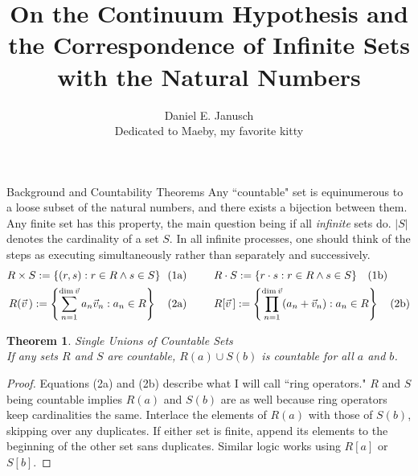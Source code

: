 \documentclass[12pt]{article}
\newtheorem{thm}{Theorem}
\begin{document}
\title{On the Continuum Hypothesis and the Correspondence of Infinite Sets with the Natural Numbers}
\author{Daniel E. Janusch\\Dedicated to Maeby, my favorite kitty}
\maketitle

\begin{section}{Background and Countability Theorems}\label{sec:background}
	Any ``countable" set is equinumerous to a loose subset of the natural numbers,
	and there exists a bijection between them. Any finite set has this property, the
	main question being if all \emph{infinite} sets do. $|S|$ denotes the cardinality
	of a set $S$. In all infinite processes, one should think of the steps as executing
	simultaneously rather than separately and successively.\vspace{-1em}\\
	\begin{align}
		R\times S :=\{(r,s):r\in R\land s\in S\}~~(1 & \text a)
		\hspace{2.5em}
		R\cdot S :=\{r\cdot s:r\in R\land s\in S\}~~~(1\text b)
		\\
		R(\vec v\,):=\left\{\sum_{n=1}^{\dim\vec v}a_n\vec v_n:a_n\in R\right\}~~~(2 & \text a)
		\hspace{2.5em}
		R[\vec v\,]:=\left\{\prod_{n=1}^{\dim\vec v}(a_n+\vec v_n):a_n\in R\right\}~~~(2\text b)
	\end{align}

	\begin{thm}\label{thm:finite unions}
		\emph{Single Unions of Countable Sets}\\
		\indent\emph{If any sets $R$ and $S$ are countable, $R(a)\cup S(b)$ is countable
		for all $a$ and $b$.}
	\end{thm}\begin{proof}
		Equations (2a) and (2b) describe what I will call ``ring operators." $R$ and $S$
		being countable implies $R(a)$ and $S(b)$ are as well because ring operators keep
		cardinalities the same. Interlace the elements of $R(a)$ with those of $S(b)$,
		skipping over any duplicates. If either set is finite, append its elements to the
		beginning of the other set sans duplicates. Similar logic works using $R[a]$
		or $S[b]$.
	\end{proof}


\end{section}
\end{document}
